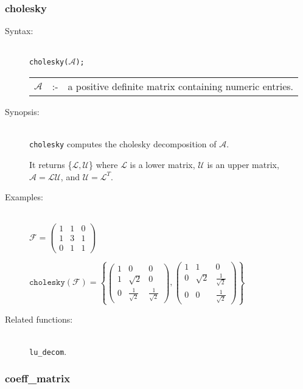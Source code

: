 \subsubsection{cholesky}
\label{linalg:cholesky}
\hypertarget{operator:CHOLESKY}{}

\begin{description}
\item[Syntax:]\mbox{}\\
\texttt{cholesky($\mathcal{A}$);}\\[2mm]
\begin{tabular}{l l l}
$\mathcal{A}$ &:-& a positive definite matrix containing numeric entries.
\end{tabular}

\item[Synopsis:]\mbox{}\\
\texttt{cholesky} computes the cholesky decomposition of $\mathcal{A}$.

It returns \{$\mathcal{L},\mathcal{U}$\} where $\mathcal{L}$
is a lower matrix, $\mathcal{U}$ is an upper matrix, \\ $\mathcal{A} =
\mathcal{LU}$, and $\mathcal{U} = \mathcal{L}^T$.

\item[Examples:]\mbox{}\\
  \(\mathcal{F} = \begin{pmatrix} 1 & 1 & 0 \\ 1 & 3 & 1 \\ 0 & 1 & 1 \end{pmatrix}\)

  \(\texttt{cholesky}(\mathcal{F})  =
  \left\{ \begin{pmatrix} 1 & 0 & 0 \\ 1 & \sqrt{2} & 0 \\
    0 & \frac{1}{\sqrt{2}} & \frac{1}{\sqrt{2}} \end{pmatrix},
  \begin{pmatrix} 1 & 1 & 0 \\ 0 & \sqrt{2} & \frac{1}{\sqrt{2}} \\ 0
    & 0 & \frac{1}{\sqrt{2}} \end{pmatrix}
  \right\}\)

\item[Related functions:]\mbox{}\\
\texttt{lu\_decom}.
\end{description}


\subsubsection{coeff\_matrix}
\label{linalg:coeff_matrix}
\hypertarget{operator:COEFF_MATRIX}{}

